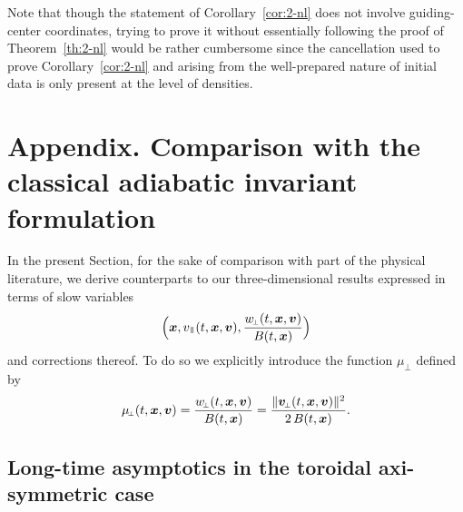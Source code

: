 \documentclass[JEP,XML,SOM,Unicode]{cedram}
\newcommand{\sperp}{{\scriptscriptstyle\perp}}
\theoremstyle{plain}
\theoremstyle{definition}
\newcommand\bfv{{\boldsymbol v}}
\newcommand\bfx{{\boldsymbol x}}
\newcommand\vpar{v_\mypar}
\newcommand\bvperp{\bfv_{\!\sperp}}
\newcommand\eperp{w_{\!\sperp}}
\newcommand\muperp{\mu_{\!\sperp}}
\newcommand{\mypar}{{\mkern3mu\vphantom{\perp}\vrule depth 0pt\mkern2mu\vrule depth 0pt\mkern3mu}}
\begin{document}
Note that though the statement of Corollary~\ref{cor:2-nl} does not involve guiding-center coordinates, trying to prove it without essentially following the proof of Theorem~\ref{th:2-nl} would be rather cumbersome since the cancellation used to prove Corollary~\ref{cor:2-nl} and arising from the well-prepared nature of initial data is only present at the level of densities.

\appendix
\section*{Appendix. Comparison with the classical adiabatic invariant formulation}\label{s:mu}
\renewcommand{\thesection}{\Alph{section}}

In the present Section, for the sake of comparison with part of the physical literature, we derive counterparts to our three-dimensional results expressed in terms of slow variables
\[
\Bigl(\bfx,\vpar(t,\bfx,\bfv),\frac{\eperp(t,\bfx,\bfv)}{B(t,\bfx)}\Bigr)
\]
and corrections thereof. To do so we explicitly introduce the function $\muperp$ defined by
\[
\muperp(t,\bfx,\bfv)
=\frac{\eperp(t,\bfx,\bfv)}{B(t,\bfx)}\\
=\frac{\|\bvperp(t,\bfx,\bfv)\|^2}{2\,B(t,\bfx)}.
\]

\subsection{Long-time asymptotics in the toroidal axi-symmetric case}
\end{document}
